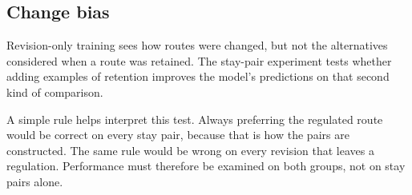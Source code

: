 \documentclass[conference,10pt,a4paper,IEEEoverridecommandlockouts]{IEEEtran}
\begin{document}
\subsection{Change bias}
\label{sec:changebias}
\label{sec:ablation-sec}


Revision-only training sees how routes were changed, but not the
alternatives considered when a route was retained. The stay-pair
experiment tests whether adding examples of retention improves the
model's predictions on that second kind of comparison.

A simple rule helps interpret this test. Always preferring the regulated
route would be correct on every stay pair, because that is how the pairs
are constructed. The same rule would be wrong on every revision that
leaves a regulation. Performance must therefore be examined on both
groups, not on stay pairs alone.
\end{document}
